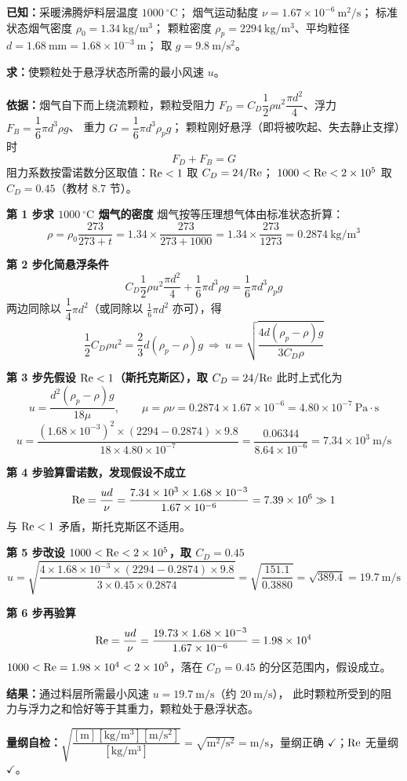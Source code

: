 \begin{jie}
\textbf{已知：}采暖沸腾炉料层温度 $1000\ ^{\circ}\mathrm{C}$；
烟气运动黏度 $\nu=1.67\times10^{-6}\ \mathrm{m^2/s}$；
标准状态烟气密度 $\rho_0=1.34\ \mathrm{kg/m^3}$；
颗粒密度 $\rho_p=2294\ \mathrm{kg/m^3}$、平均粒径 $d=1.68\ \mathrm{mm}=1.68\times10^{-3}\ \mathrm{m}$；
取 $g=9.8\ \mathrm{m/s^2}$。

\textbf{求：}使颗粒处于悬浮状态所需的最小风速 $u$。

\textbf{依据：}烟气自下而上绕流颗粒，颗粒受阻力
$F_D=C_D\dfrac{1}{2}\rho u^{2}\dfrac{\pi d^{2}}{4}$、浮力 $F_B=\dfrac{1}{6}\pi d^{3}\rho g$、
重力 $G=\dfrac{1}{6}\pi d^{3}\rho_p g$；
颗粒刚好悬浮（即将被吹起、失去静止支撑）时
\[ F_D+F_B=G \]
阻力系数按雷诺数分区取值：$\mathrm{Re}<1$ 取 $C_D=24/\mathrm{Re}$；
$1000<\mathrm{Re}<2\times10^{5}$ 取 $C_D=0.45$（教材 8.7 节）。

\textbf{第 1 步\quad 求 $1000\ ^{\circ}\mathrm{C}$ 烟气的密度}
烟气按等压理想气体由标准状态折算：
\[ \rho=\rho_0\frac{273}{273+t}=1.34\times\frac{273}{273+1000}
=1.34\times\frac{273}{1273}=0.2874\ \mathrm{kg/m^3} \]

\textbf{第 2 步\quad 化简悬浮条件}
\[ C_D\frac{1}{2}\rho u^{2}\frac{\pi d^{2}}{4}+\frac{1}{6}\pi d^{3}\rho g
=\frac{1}{6}\pi d^{3}\rho_p g \]
两边同除以 $\dfrac{1}{4}\pi d^{2}$（或同除以 $\frac{1}{6}\pi d^{2}$ 亦可），得
\[ \frac{1}{2}C_D\rho u^{2}=\frac{2}{3}d\left(\rho_p-\rho\right)g
\ \Longrightarrow\ u=\sqrt{\frac{4d\left(\rho_p-\rho\right)g}{3C_D\rho}} \]

\textbf{第 3 步\quad 先假设 $\mathrm{Re}<1$（斯托克斯区），取 $C_D=24/\mathrm{Re}$}
此时上式化为
\[ u=\frac{d^{2}\left(\rho_p-\rho\right)g}{18\mu},\qquad
\mu=\rho\nu=0.2874\times1.67\times10^{-6}=4.80\times10^{-7}\ \mathrm{Pa\cdot s} \]
\[ u=\frac{\left(1.68\times10^{-3}\right)^{2}\times(2294-0.2874)\times9.8}
{18\times4.80\times10^{-7}}=\frac{0.06344}{8.64\times10^{-6}}=7.34\times10^{3}\ \mathrm{m/s} \]

\textbf{第 4 步\quad 验算雷诺数，发现假设不成立}
\[ \mathrm{Re}=\frac{ud}{\nu}=\frac{7.34\times10^{3}\times1.68\times10^{-3}}{1.67\times10^{-6}}
=7.39\times10^{6}\gg1 \]
与 $\mathrm{Re}<1$ 矛盾，斯托克斯区不适用。

\textbf{第 5 步\quad 改设 $1000<\mathrm{Re}<2\times10^{5}$，取 $C_D=0.45$}
\[ u=\sqrt{\frac{4\times1.68\times10^{-3}\times(2294-0.2874)\times9.8}
{3\times0.45\times0.2874}}=\sqrt{\frac{151.1}{0.3880}}=\sqrt{389.4}=19.7\ \mathrm{m/s} \]

\textbf{第 6 步\quad 再验算}
\[ \mathrm{Re}=\frac{ud}{\nu}=\frac{19.73\times1.68\times10^{-3}}{1.67\times10^{-6}}=1.98\times10^{4} \]
$1000<\mathrm{Re}=1.98\times10^{4}<2\times10^{5}$，落在 $C_D=0.45$ 的分区范围内，假设成立。

\textbf{结果：}通过料层所需最小风速 $u=19.7\ \mathrm{m/s}$（约 $20\ \mathrm{m/s}$），
此时颗粒所受到的阻力与浮力之和恰好等于其重力，颗粒处于悬浮状态。

\textbf{量纲自检：}$\sqrt{\dfrac{[\mathrm{m}][\mathrm{kg/m^3}][\mathrm{m/s^2}]}{[\mathrm{kg/m^3}]}}
=\sqrt{\mathrm{m^2/s^2}}=\mathrm{m/s}$，量纲正确 $\checkmark$；$\mathrm{Re}$ 无量纲 $\checkmark$。
\end{jie}

